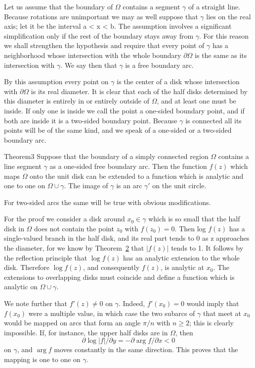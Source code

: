 Let us assume that the boundary of $\Omega$ contains a segment $\gamma$ of a straight line. Because rotations are unimportant we may as well suppose that $\gamma$ lies on the real axis; let it be the interval a < x < b. The assumption involves a significant simplification only if the rest of the boundary stays away from $\gamma$. For this reason we shall strengthen the hypothesis and require that every point of $\gamma$ has a neighborhood whose intersection with the whole boundary $\partial\Omega$ is the same as its intersection with $\gamma$. We say then that $\gamma$ is a free boundary arc.

By this assumption every point on $\gamma$ is the center of a disk whose intersection with $\partial\Omega$ is its real diameter. It is clear that each of the half disks determined by this diameter is entirely in or entirely outside of $\Omega$, and at least one must be inside. If only one is inside we call the point a one-sided boundary point, and if both are inside it is a two-sided boundary point. Because $\gamma$ is connected all its points will be of the same kind, and we speak of a one-sided or a two-sided boundary arc.

\begin{originalstatement}{Theorem}{3}\label{thm:6.3}
Suppose that the boundary of a simply connected region $\Omega$ contains a line segment $\gamma$ as a one-sided free boundary arc. Then the function $f(z)$ which maps $\Omega$ onto the unit disk can be extended to a function which is analytic and one to one on $\Omega \cup \gamma$. The image of $\gamma$ is an arc $\gamma'$ on the unit circle.
\end{originalstatement}
For two-sided arcs the same will be true with obvious modifications.

For the proof we consider a disk around $x_0 \in \gamma$ which is so small that the half disk in $\Omega$ does not contain the point $z_0$ with $f(z_0) = 0$. Then
log $f(z)$ has a single-valued branch in the half disk, and its real part tends to 0 as z approaches the diameter, for we know by Theorem~\hyperref[thm:6.2]{2} that $|f(z)|$ tends to 1. It follows by the reflection principle that $\log f(z)$ has an analytic extension to the whole disk. Therefore $\log f(z)$, and consequently $f(z)$, is analytic at $x_{0}$. The extensions to overlapping disks must coincide and define a function which is analytic on $\Omega \cup \gamma$.

We note further that $f'(z) \neq 0$ on $\gamma$. Indeed, $f'(x_0) = 0$ would imply that $f(x_0)$ were a multiple value, in which case the two subarcs of $\gamma$ that meet at $x_0$ would be mapped on arcs that form an angle $\pi / n$ with $n \geq 2$; this is clearly impossible. If, for instance, the upper half disks are in $\Omega$, then
\begin{equation*}
\partial \log | f | / \partial y = - \partial \arg f / \partial x <   0
\end{equation*}
on $\gamma$, and $\arg f$ moves constantly in the same direction. This proves that the mapping is one to one on $\gamma$.

